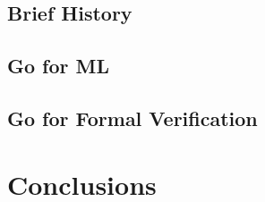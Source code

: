 \subsection{Brief History}
\subsection{Go for ML}
\subsection{Go for Formal Verification}

\section{Conclusions}
